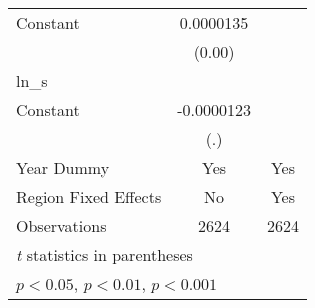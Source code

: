 {\begin{longtable}{l*{2}{c}}
Constant            &   0.0000135         &                     \\
                    &      (0.00)         &                     \\
\hline
ln\_s                &                     &                     \\
Constant            &  -0.0000123         &                     \\
                    &         (.)         &                     \\
[1em]
Year Dummy          &         Yes         &         Yes         \\
[1em]
Region Fixed Effects &          No         &         Yes         \\
\hline
Observations        &        2624         &        2624         \\
\hline\hline
\multicolumn{3}{l}{\footnotesize \textit{t} statistics in parentheses}\\
\multicolumn{3}{l}{\footnotesize \sym{*} \(p<0.05\), \sym{**} \(p<0.01\), \sym{***} \(p<0.001\)}\\
\end{longtable}
}
